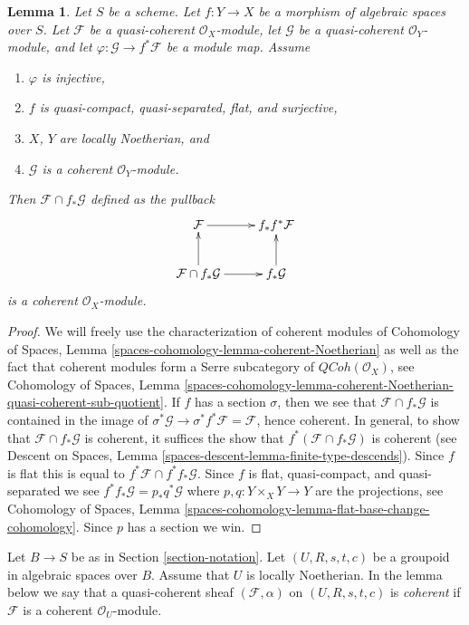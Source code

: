 \documentclass{stacks-project}
\theoremstyle{plain}
\newtheorem{lemma}[subsection]{Lemma}
\theoremstyle{definition}
\theoremstyle{remark}
\numberwithin{equation}{subsection}
\def\QCoh{\mathit{QCoh}}
\begin{document}
\begin{lemma}
\label{lemma-push-pull}
Let $S$ be a scheme.
Let $f : Y \to X$ be a morphism of algebraic spaces over $S$. Let $\mathcal{F}$
be a quasi-coherent $\mathcal{O}_X$-module, let $\mathcal{G}$
be a quasi-coherent $\mathcal{O}_Y$-module, and let
$\varphi : \mathcal{G} \to f^*\mathcal{F}$ be a module map. Assume
\begin{enumerate}
\item $\varphi$ is injective,
\item $f$ is quasi-compact, quasi-separated, flat, and surjective,
\item $X$, $Y$ are locally Noetherian, and
\item $\mathcal{G}$ is a coherent $\mathcal{O}_Y$-module.
\end{enumerate}
Then $\mathcal{F} \cap f_*\mathcal{G}$ defined as the pullback
$$
\xymatrix{
\mathcal{F} \ar[r] & f_*f^*\mathcal{F} \\
\mathcal{F} \cap f_*\mathcal{G} \ar[u] \ar[r] &
f_*\mathcal{G} \ar[u]
}
$$
is a coherent $\mathcal{O}_X$-module.
\end{lemma}

\begin{proof}
We will freely use the characterization of coherent modules of
Cohomology of Spaces, Lemma \ref{spaces-cohomology-lemma-coherent-Noetherian}
as well as the fact that coherent modules form a Serre subcategory
of $\QCoh(\mathcal{O}_X)$, see
Cohomology of Spaces, Lemma
\ref{spaces-cohomology-lemma-coherent-Noetherian-quasi-coherent-sub-quotient}.
If $f$ has a section $\sigma$, then we see that
$\mathcal{F} \cap f_*\mathcal{G}$ is contained in the image of
$\sigma^*\mathcal{G} \to \sigma^*f^*\mathcal{F} = \mathcal{F}$,
hence coherent. In general, to show that $\mathcal{F} \cap f_*\mathcal{G}$
is coherent, it suffices the show that
$f^*(\mathcal{F} \cap f_*\mathcal{G})$ is coherent (see
Descent on Spaces, Lemma \ref{spaces-descent-lemma-finite-type-descends}).
Since $f$ is flat this is equal to $f^*\mathcal{F} \cap f^*f_*\mathcal{G}$.
Since $f$ is flat, quasi-compact, and quasi-separated we see
$f^*f_*\mathcal{G} = p_*q^*\mathcal{G}$ where $p, q : Y \times_X Y \to Y$
are the projections, see Cohomology of Spaces, Lemma
\ref{spaces-cohomology-lemma-flat-base-change-cohomology}.
Since $p$ has a section we win.
\end{proof}

\noindent
Let $B \to S$ be as in Section \ref{section-notation}.
Let $(U, R, s, t, c)$ be a groupoid in algebraic spaces over $B$.
Assume that $U$ is locally Noetherian. In the lemma below we say that a
quasi-coherent sheaf $(\mathcal{F}, \alpha)$ on $(U, R, s, t, c)$ is
{\it coherent} if $\mathcal{F}$ is a coherent $\mathcal{O}_U$-module.
\end{document}
